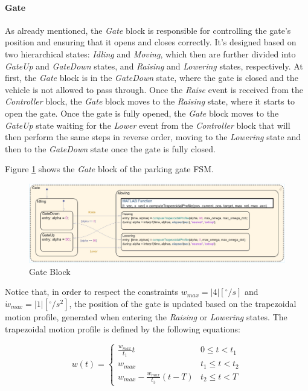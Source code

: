 \paragraph{Gate}

As already mentioned, the \textit{Gate} block is responsible for controlling the gate's position and ensuring that it opens and closes correctly.
It's designed based on two hierarchical states: \textit{Idling} and \textit{Moving}, which then are further divided into \textit{GateUp} and \textit{GateDown} states, and \textit{Raising} and \textit{Lowering} states, respectively.
At first, the \textit{Gate} block is in the \textit{GateDown} state, where the gate is closed and the vehicle is not allowed to pass through.
Once the \textit{Raise} event is received from the \textit{Controller} block, the \textit{Gate} block moves to the \textit{Raising} state, where it starts to open the gate.
Once the gate is fully opened, the \textit{Gate} block moves to the \textit{GateUp} state waiting for the \textit{Lower} event from the \textit{Controller} block that will then perform the same steps in reverse order, moving to the \textit{Lowering} state and then to the \textit{GateDown} state once the gate is fully closed.

Figure \ref{fig:gate_block} shows the \textit{Gate} block of the parking gate FSM.

\begin{figure}[H]
    \centering
    \includegraphics[width=1.0\textwidth]{./img/MATLAB/gate_block.pdf}
    \caption{Gate Block}
    \label{fig:gate_block}
\end{figure}

Notice that, in order to respect the constraints $w_{max} = |4| [^\circ / s]$ and $\dot{w}_{max} = |1| [^\circ / s^2]$, the position of the gate is updated based on the trapezoidal motion profile, generated when entering the \textit{Raising} or \textit{Lowering} states.
The trapezoidal motion profile is defined by the following equations:

\begin{equation}
    w(t) = \begin{cases}
        \frac{w_{max}}{t_1} t                 & 0 \leq t < t_1   \\
        w_{max}                               & t_1 \leq t < t_2 \\
        w_{max} - \frac{w_{max}}{t_3} (t - T) & t_2 \leq t < T
    \end{cases}
\end{equation}

